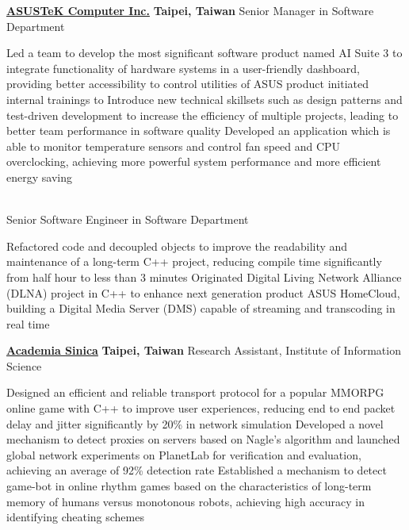 \documentclass[a4paper,10pt,oneside]{article}
\begin{document}
\begin{body}
\SmallEntryGap
\href{http://www.asus.com/US/}
{\textbf{ASUSTeK Computer Inc.}}
\hfill
\textbf{Taipei, Taiwan}
Senior Manager in Software Department
\begin{detail}
\BulletItem
Led a team to develop the most significant software product named AI Suite 3 to integrate functionality of hardware systems in a user-friendly dashboard, providing better accessibility to control utilities of ASUS product
\BulletItem
initiated internal trainings to Introduce new technical skillsets such as design patterns and test-driven development to increase the efficiency of multiple projects, leading to better team performance in software quality
\BulletItem
Developed an application which is able to monitor temperature sensors and control fan speed and CPU overclocking, achieving more powerful system performance and more efficient energy saving
\end{detail}
\\[-2em]
Senior Software Engineer in Software Department
\begin{detail}
\BulletItem
Refactored code and decoupled objects to improve the readability and maintenance of a long-term C++ project, reducing compile time significantly from half hour to less than 3 minutes
\BulletItem
Originated Digital Living Network Alliance (DLNA) project in C++ to enhance next generation product ASUS HomeCloud, building a Digital Media Server (DMS) capable of streaming and transcoding in real time
\end{detail}

\SmallEntryGap
\href{http://www.iis.sinica.edu.tw/index_en.html}
{\textbf{Academia Sinica}}
\hfill
\textbf{Taipei, Taiwan}
Research Assistant, Institute of Information Science
\begin{detail}
\BulletItem
Designed an efficient and reliable transport protocol for a popular MMORPG online game with C++ to improve user experiences, reducing end to end packet delay and jitter significantly by 20\% in network simulation
\BulletItem
Developed a novel mechanism to detect proxies on servers based on Nagle's algorithm and launched global network experiments on PlanetLab for verification and evaluation, achieving an average of 92\% detection rate
\BulletItem
Established a mechanism to detect game-bot in online rhythm games based on the characteristics of long-term memory of humans versus monotonous robots, achieving high accuracy in identifying cheating schemes
\end{detail}


\end{body}
\end{document}

